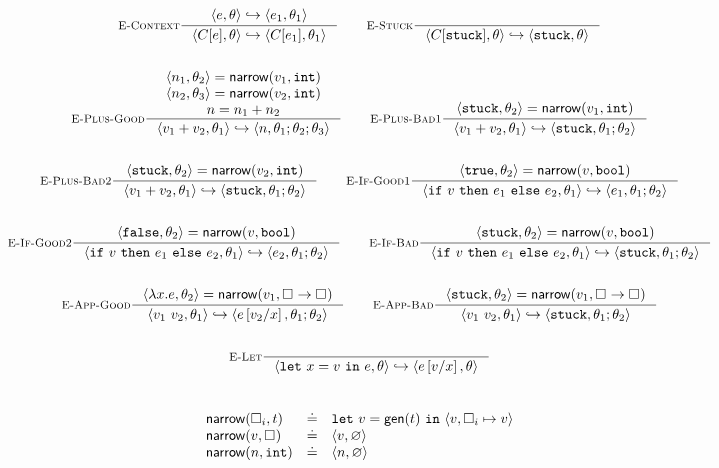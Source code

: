 \begin{figure*}
\begin{gather*}
\inference[\recontext]
  {\step{e}{\su}{e_1}{\su_1}}
  {\step{C[e]}{\su}{C[e_1]}{\su_1}}
\qquad
\inference[\restuck]
  {}
  {\step{C[\stuck]}{\su}{\stuck}{\su}}
\\ \\
\inference[\replusgood]
  {\pair{n_1}{\su_2} = \force{v_1}{\tint} \\
   \pair{n_2}{\su_3} = \force{v_2}{\tint} \\ 
   n = \eplus{n_1}{n_2}}
  {\step{\eplus{v_1}{v_2}}{\su_1}{n}{\su_1;\su_2;\su_3}}
\qquad
\inference[\replusbadone]
  {\pair{\stuck}{\su_2} = \force{v_1}{\tint}}
  {\step{\eplus{v_1}{v_2}}{\su_1}{\stuck}{\su_1;\su_2}}
\\ \\
\inference[\replusbadtwo]
  {\pair{\stuck}{\su_2} = \force{v_2}{\tint}}
  {\step{\eplus{v_1}{v_2}}{\su_1}{\stuck}{\su_1;\su_2}}
\qquad
\inference[\reifgoodone]
  {\pair{\etrue}{\su_2} = \force{v}{\tbool}}
  {\step{\eif{v}{e_1}{e_2}}{\su_1}{e_1}{\su_1;\su_2}}
\\ \\
\inference[\reifgoodtwo]
  {\pair{\efalse}{\su_2} = \force{v}{\tbool}}
  {\step{\eif{v}{e_1}{e_2}}{\su_1}{e_2}{\su_1;\su_2}}
\qquad
\inference[\reifbad]
  {\pair{\stuck}{\su_2} = \force{v}{\tbool}}
  {\step{\eif{v}{e_1}{e_2}}{\su_1}{\stuck}{\su_1;\su_2}}
\\ \\
\inference[\reappgood]
  {\pair{\efun{x}{e}}{\su_2} = \force{v_1}{\tfun{\thole{}}{\thole{}}}}
  {\step{\eapp{v_1}{v_2}}{\su_1}{e\sub{x}{v_2}}{\su_1;\su_2}}
\qquad
\inference[\reappbad]
  {\pair{\stuck}{\su_2} = \force{v_1}{\tfun{\thole{}}{\thole{}}}}
  {\step{\eapp{v_1}{v_2}}{\su_1}{\stuck}{\su_1;\su_2}}
\\ \\
\inference[\relet]
  {}
  {\step{\elet{x}{v}{e}}{\su}{e\sub{x}{v}}{\su}}
\end{gather*}
\\ %
\begin{gather*}
\begin{array}{lcl}
\mathsf{narrow}(\square_{i}, t) & \doteq & \mathtt{let}\ v = \mathsf{gen}(t)\ \mathtt{in}\ \langle v, \square_{i} \mapsto v \rangle \\
\mathsf{narrow}(v, \square_{})  & \doteq & \langle v, \varnothing \rangle \\
\mathsf{narrow}(n, \mathtt{int})    & \doteq & \langle n, \varnothing \rangle \\

\end{array}
\end{gather*}
\end{figure*}
